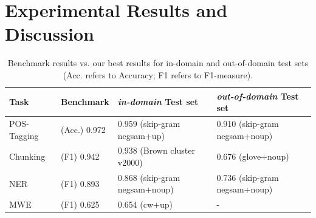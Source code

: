 \section{Experimental Results and Discussion}

\begin{table}[t]
\begin{center}
\begin{small}
\begin{tabular}{llll}
\hline
\textbf{Task} & \textbf{Benchmark} & \textbf{\textit{in-domain} Test set} & \textbf{\textit{out-of-domain} Test set} \\ \hline
POS-Tagging & (Acc.) 0.972 \cite{Toutanova:2003} & 0.959 (skip-gram negsam+up) & 0.910 (skip-gram negsam+noup)\\ 
Chunking & (F1) 0.942 \cite{Sha:2003} & 0.938 (Brown cluster v2000) & 0.676 (glove+noup)\\  
NER & (F1) 0.893 \cite{Ando:2005} & 0.868 (skip-gram negsam+noup) & 0.736 (skip-gram negsam+noup) \\  
MWE & (F1) 0.625 \cite{Schneider+:2014} & 0.654 (cw+up) & - \\ 
\hline
\end{tabular}
\caption{Benchmark results vs. our best results for in-domain and out-of-domain test sets (Acc. refers to Accuracy; F1 refers to F1-measure).}
\label{benchmark}
\end{small}
\end{center}
\end{table}

